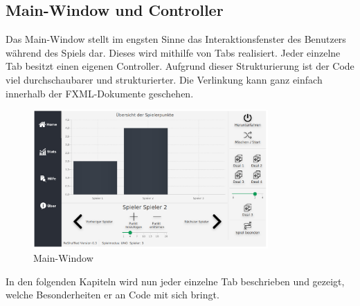 \subsection{Main-Window und Controller}\label{subsec:mainController}
Das Main-Window stellt im engsten Sinne das Interaktionsfenster des Benutzers während des Spiels dar.
Dieses wird mithilfe von Tabs realisiert.
Jeder einzelne Tab besitzt einen eigenen Controller.
Aufgrund dieser Strukturierung ist der Code viel durchschaubarer und strukturierter.
Die Verlinkung kann ganz einfach innerhalb der FXML-Dokumente geschehen.
\begin{figure}[H]
\centering
\includegraphics[width=0.8\textwidth]{fig/ainf/Main_Home_German.png}
\caption{Main-Window}
\label{mainWindows}
\end{figure}
In den folgenden Kapiteln wird nun jeder einzelne Tab beschrieben und gezeigt, welche Besonderheiten er an Code mit sich bringt.
